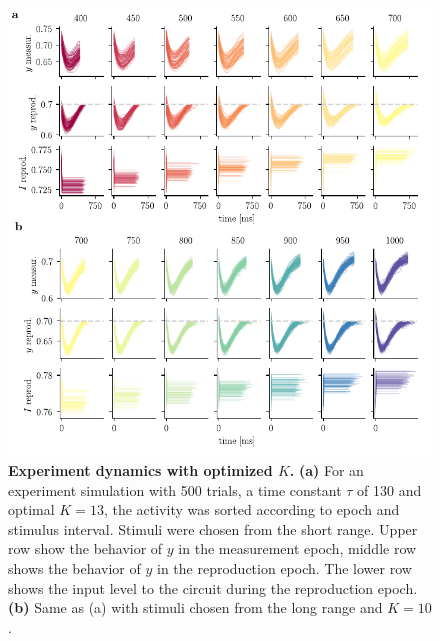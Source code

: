 \documentclass[10pt]{article}
\begin{document}
\begin{figure}[!htb]
	\centering
	\includegraphics{figures/supp_experiment.pdf}
	\caption{\textbf{Experiment dynamics with optimized $K$.}
	\textbf{(a)} For an experiment simulation with 500 trials, a time constant $\tau$ of 130 and optimal $K = 13$, the activity was sorted according to epoch and stimulus interval. Stimuli were chosen from the short range. Upper row show the behavior of $y$ in the measurement epoch, middle row shows the behavior of $y$ in the reproduction epoch. The lower row shows the input level to the circuit during the reproduction epoch. 
	\textbf{(b)} Same as (a) with stimuli chosen from the long range and $K = 10$. 
	}
\label{sup:experiment}
\end{figure}
\end{document}
